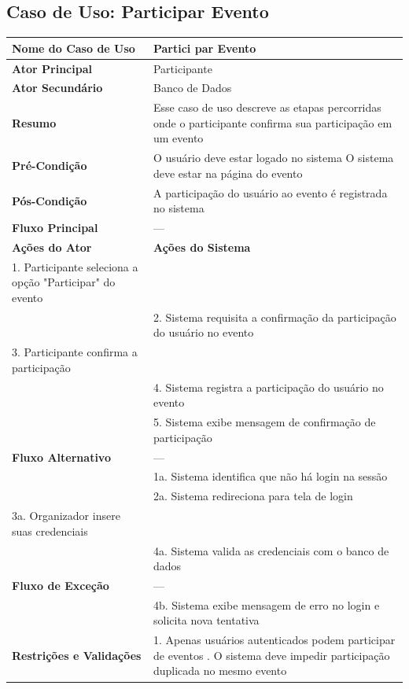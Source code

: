 \documentclass[12pt,a4paper]{article}
\begin{document}
\subsection{Caso de Uso: Participar Evento}
\begin{longtable}{|p{4cm}|p{11cm}|}
\hline
\textbf{Nome do Caso de Uso} & Partici
par Evento \\ \hline
\textbf{Ator Principal} & Participante \\ \hline
\textbf{Ator Secundário} & Banco de Dados \\ \hline
\textbf{Resumo} & Esse caso de uso descreve as etapas percorridas onde o participante confirma sua participação em um evento \\ \hline
\textbf{Pré-Condição} & O usuário deve estar logado no sistema \newline O sistema deve estar na página do evento \\ \hline
\textbf{Pós-Condição} & A participação do usuário ao evento é registrada no sistema \\ \hline
\textbf{Fluxo Principal} & --- \\ \hline
\textbf{Ações do Ator} & \textbf{Ações do Sistema} \\ \hline
1. Participante seleciona a opção "Participar" do evento & \\ \hline
& 2. Sistema requisita a confirmação da participação do usuário no evento \\ \hline
3. Participante confirma a participação & \\ \hline
& 4. Sistema registra a participação do usuário no evento \\ \hline
& 5. Sistema exibe mensagem de confirmação de participação \\ \hline
\textbf{Fluxo Alternativo} & --- \\ \hline
& 1a. Sistema identifica que não há login na sessão \\ \hline
& 2a. Sistema redireciona para tela de login \\ \hline
3a. Organizador insere suas credenciais & \\ \hline
& 4a. Sistema valida as credenciais com o banco de dados \\ \hline
\textbf{Fluxo de Exceção} & --- \\ \hline
& 4b. Sistema exibe mensagem de erro no login e solicita nova tentativa \\ \hline
\textbf{Restrições e Validações} & 1. Apenas usuários autenticados podem participar de eventos \newline 2. O sistema deve impedir participação duplicada no mesmo evento \\ \hline
\end{longtable}
\end{document}
